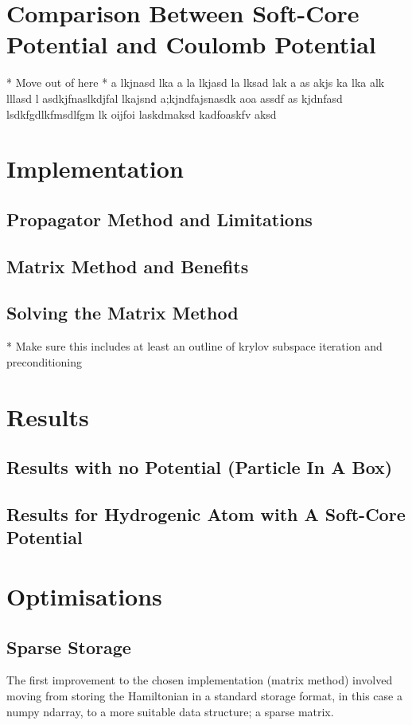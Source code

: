 \section{Comparison Between Soft-Core Potential and Coulomb Potential}
* Move out of here *
a lkjnasd lka a la lkjasd la lksad lak a
as akjs ka lka alk lllasd l
asdkjfnaslkdjfal lkajsnd a;kjndfajsnasdk aoa 
assdf as kjdnfasd
lsdkfgdlkfmsdlfgm lk oijfoi  laskdmaksd kadfoaskfv aksd

\section{Implementation}

\subsection{Propagator Method and Limitations}

\subsection{Matrix Method and Benefits}

\subsection{Solving the Matrix Method}
* Make sure this includes at least an outline of krylov subspace iteration and preconditioning

\section{Results}

\subsection{Results with no Potential (Particle In A Box)}

\subsection{Results for Hydrogenic Atom with A Soft-Core Potential}

\section{Optimisations}

\subsection{Sparse Storage}
The first improvement to the chosen implementation (matrix method) involved moving from storing the Hamiltonian in a standard storage format, in this case a numpy ndarray, to a more suitable data structure; a sparse matrix. 

